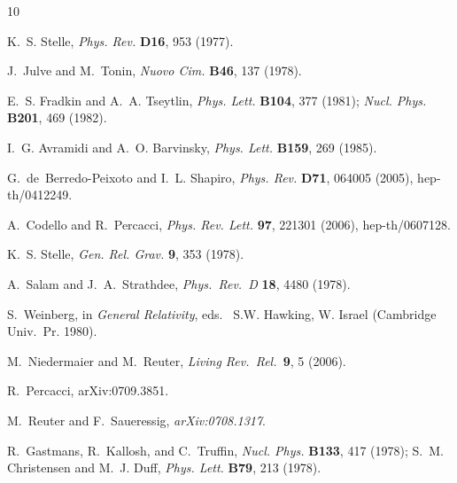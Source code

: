 \documentclass[11pt,reqno]{article}
\newcommand{\2}{\sqrt{2\,}}
\begin{document}
\begin{thebibliography}{10}

K.~S. Stelle,
{\it Phys. Rev. }{\bf D16}, 953 (1977).

J.~Julve and M.~Tonin,
{\it Nuovo Cim. }{\bf B46}, 137 (1978).

E.~S. Fradkin and A.~A. Tseytlin,
{\it Phys. Lett. }{\bf B104}, 377 (1981);
{\it Nucl. Phys. }{\bf B201}, 469 (1982).


I.~G. Avramidi and A.~O. Barvinsky,
{\it Phys. Lett. }{\bf B159}, 269 (1985).

G.~de~Berredo-Peixoto and I.~L. Shapiro,
{\it Phys. Rev. }{\bf D71}, 064005 (2005), hep-th/0412249.

A.~Codello and R.~Percacci,
{\it Phys. Rev. Lett. }{\bf 97}, 221301 (2006), hep-th/0607128.

K.~S. Stelle,
{\it Gen. Rel. Grav. }{\bf 9}, 353 (1978).

 A.~Salam and J.~A.~Strathdee,
{\it Phys.\ Rev.\  D }{\bf 18}, 4480 (1978).

S.~Weinberg,
in {\it General Relativity}, eds.~ S.W. Hawking, W. Israel (Cambridge Univ.\
  Pr. 1980).

 M.~Niedermaier and M.~Reuter,
{\it  Living Rev.\ Rel.\  }{\bf 9}, 5 (2006).

R.~Percacci,
arXiv:0709.3851.

M.~Reuter and F.~Saueressig,
{\it arXiv:0708.1317}.

R.~Gastmans, R.~Kallosh, and C.~Truffin,
{\it Nucl. Phys. }{\bf B133}, 417 (1978);
S.~M. Christensen and M.~J. Duff,
{\it Phys. Lett. }{\bf B79}, 213 (1978).


\end{thebibliography}
\end{document}
